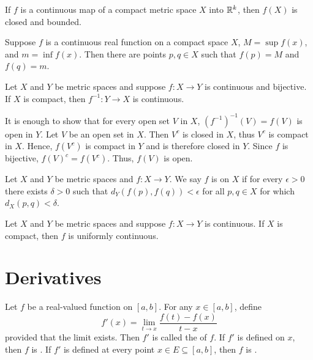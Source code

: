 \documentclass{mathnotes}
\begin{document}
\begin{prop}
  If $f$ is a continuous map of a compact metric space $X$ into $\mathbb{R}^k$, then
  $f(X)$ is closed and bounded.
\end{prop}

\begin{prop}
  Suppose $f$ is a continuous real function on a compact space $X$, $M=\sup
  f(x)$, and $m=\inf f(x)$. Then there are points $p,q\in X$ such that $f(p)=M$
  and $f(q)=m$.
\end{prop}

\begin{prop}
  Let $X$ and $Y$ be metric spaces and suppose $f:X\to Y$ is continuous and
  bijective. If $X$ is compact, then $f^{-1}:Y\to X$ is continuous.
\end{prop}

\begin{pf}
  It is enough to show that for every open set $V$ in $X$,
  $(f^{-1})^{-1}(V)=f(V)$ is open in $Y$. Let $V$ be an open set in $X$. Then
  $V^c$ is closed in $X$, thus $V^c$ is compact in $X$. Hence, $f(V^c)$ is
  compact in $Y$ and is therefore closed in $Y$. Since $f$ is bijective,
  $f(V)^c=f(V^c)$. Thus, $f(V)$ is open.
\end{pf}

\begin{defi}
  Let $X$ and $Y$ be metric spaces and $f:X\to Y$. We say $f$ is
   on $X$ if for every $\epsilon>0$ there exists
  $\delta>0$ such that $d_Y(f(p),f(q))<\epsilon$ for all $p,q\in X$ for which
  $d_X(p,q)<\delta$.
\end{defi}

\begin{prop}
  Let $X$ and $Y$ be metric spaces and suppose $f:X\to Y$ is continuous. If $X$
  is compact, then $f$ is uniformly continuous.
\end{prop}

\section*{Derivatives}

\begin{bdefi}
  Let $f$ be a real-valued function on $[a,b]$. For any $x\in[a,b]$, define
  $$f'(x)=\lim_{t\to x}\frac{f(t)-f(x)}{t-x}$$
  provided that the limit exists. Then $f'$ is called the 
  of $f$. If $f'$ is defined on $x$, then $f$ is . If $f'$ is defined at every point $x\in E\subseteq[a,b]$, then $f$ is
  .
\end{bdefi}
\end{document}
